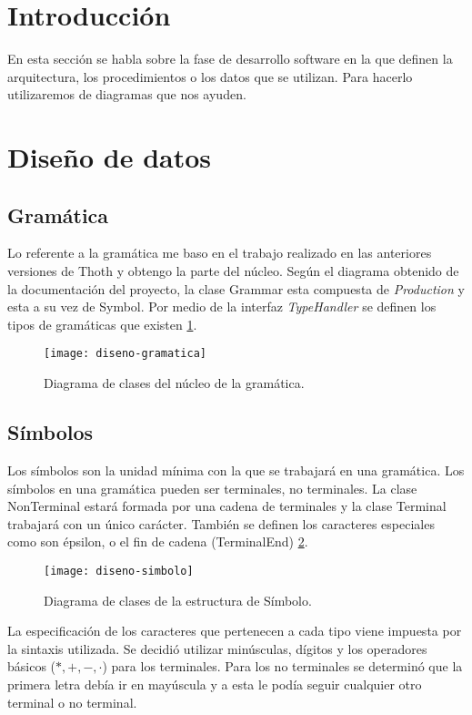 
\section{Introducción}
En esta sección se habla sobre la fase de desarrollo software en la que definen la arquitectura, los procedimientos o los datos que se utilizan. Para hacerlo utilizaremos de diagramas que nos ayuden.

\section{Diseño de datos}

\subsection{Gramática}
Lo referente a la gramática me baso en el trabajo realizado en las anteriores versiones de Thoth \cite{thothv2} y obtengo la parte del núcleo. Según el diagrama obtenido de la documentación del proyecto, la clase Grammar esta compuesta de \emph{Production} y esta a su vez de Symbol. Por medio de la interfaz \emph{TypeHandler} se definen los tipos de gramáticas que existen \ref{fig:4.1}.

\begin{figure}[h]
\centering
\texttt{[image: diseno-gramatica]}
\caption{Diagrama de clases del núcleo de la gramática\cite{thothv2}.}
\label{fig:4.1}
\end{figure}


\subsection{Símbolos}

Los símbolos son la unidad mínima con la que se trabajará en una gramática. Los símbolos en una gramática pueden ser terminales, no terminales. La clase NonTerminal estará formada por una cadena de terminales y la clase Terminal trabajará con un único carácter. También se definen los caracteres especiales como son épsilon, o el fin de cadena (TerminalEnd) \ref{fig:4.2}.

\begin{figure}[h]
\centering
\texttt{[image: diseno-simbolo]}
\caption{Diagrama de clases de la estructura de Símbolo.}
\label{fig:4.2}
\end{figure}

La especificación de los caracteres que pertenecen a cada tipo viene impuesta por la sintaxis utilizada. Se decidió utilizar minúsculas, dígitos y los operadores básicos ($\ast,+,-,\cdot$) para los terminales. Para los no terminales se determinó que la primera letra debía ir en mayúscula y a esta le podía seguir cualquier otro terminal o no terminal.

